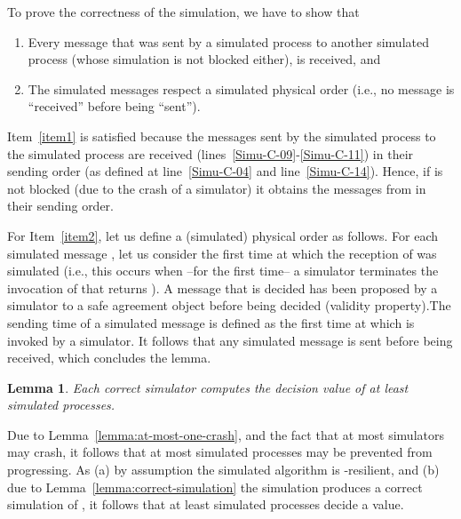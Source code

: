 \documentclass[11pt,letterpaper]{article}
\newtheorem{lemma}{Lemma}
\newlength {\afterproof}
\newcommand{\toto}{xxx}
\newenvironment{proofL}{\noindent{\bf Proof }}
{\hspace*{\fill}\par\vspace{\afterproof}}
\begin{document}
\begin{proofL}
To prove the correctness of the simulation, we have  to show that
\begin{enumerate}
\vspace{-0.2cm}
\item
\label{item1}
Every message that was sent by a simulated process to another simulated
process (whose simulation is not blocked either), is received, and
\vspace{-0.2cm}
\item
\label{item2}
The simulated messages respect a simulated physical order
(i.e., no message is ``received'' before being  ``sent'').
\end{enumerate}

Item~\ref{item1} is satisfied because the messages sent by
the simulated process  to the simulated process  are received
(lines~\ref{Simu-C-09}-\ref{Simu-C-11}) in their sending order
(as defined at line~\ref{Simu-C-04}  and line~\ref{Simu-C-14}).
Hence, if  is not blocked (due to the crash of a simulator)
it obtains the messages from  in their sending order.


For Item~\ref{item2}, let us define a (simulated) physical order as follows.
For each simulated message , let us consider the first time at which the
reception of   was simulated (i.e., this occurs when
 --for the first time-- a simulator terminates  the invocation  of
  that returns ).
A message that is decided has been proposed by a simulator to a safe agreement
object before  being decided (validity property).The  sending time of  a
simulated message is defined as  the first time at which
 is  invoked by a simulator.
It follows that any simulated  message is sent before being received,
which concludes the lemma.
\renewcommand{\toto}{lemma:correct-simulation}
\end{proofL}


\begin{lemma}
\label{lemma:nb-simulated-proc}
Each correct simulator  computes the decision value of
at least  simulated processes.
\end{lemma}

\begin{proofL}
Due to Lemma~\ref{lemma:at-most-one-crash}, and the fact that at most 
simulators may crash, it follows that at most  simulated processes may be
prevented from progressing. As (a) by assumption the simulated algorithm 
is -resilient, and (b) due to Lemma~\ref{lemma:correct-simulation}
the simulation produces a correct simulation of , it follows that at
least  simulated processes decide a value.
\renewcommand{\toto}{lemma:nb-simulated-proc}
\end{proofL}
\end{document}
